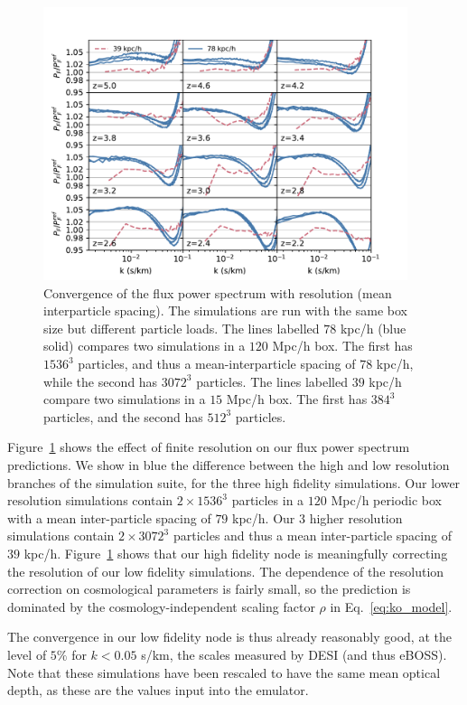 \documentclass[a4paper,11pt]{article}
\begin{document}
\begin{figure}
\includegraphics[width=0.95\textwidth,trim={0 0 1cm 0},clip]{figures/resolution-convergence.pdf}
 \caption{Convergence of the flux power spectrum with resolution (mean interparticle spacing). The simulations are run with the same box size but different particle loads. The lines labelled $78$ kpc/h (blue solid) compares two simulations in a $120$ Mpc/h box. The first has $1536^3$ particles, and thus a mean-interparticle spacing of $78$ kpc/h, while the second has $3072^3$ particles. The lines labelled $39$ kpc/h compare two simulations in a $15$ Mpc/h box. The first has $384^3$ particles, and the second has $512^3$ particles.}
 \label{fig:resolution}
\end{figure}

Figure~\ref{fig:resolution} shows the effect of finite resolution on our flux power spectrum predictions. We show in blue the difference between the high and low resolution branches of the simulation suite, for the three high fidelity simulations. Our lower resolution simulations contain $2\times 1536^3$ particles in a $120$ Mpc/h periodic box with a mean inter-particle spacing of $79$ kpc/h. Our $3$ higher resolution simulations contain $2\times 3072^3$ particles and thus a mean inter-particle spacing of $39$ kpc/h. Figure~\ref{fig:resolution} shows that our high fidelity node is meaningfully correcting the resolution of our low fidelity simulations. The dependence of the resolution correction on cosmological parameters is fairly small, so the prediction is dominated by the cosmology-independent scaling factor $\rho$ in Eq.~\ref{eq:ko_model}.

The convergence in our low fidelity node is thus already reasonably good, at the level of $5\%$ for $k < 0.05$ s/km, the scales measured by DESI (and thus eBOSS). Note that these simulations have been rescaled to have the same mean optical depth, as these are the values input into the emulator.
\end{document}
